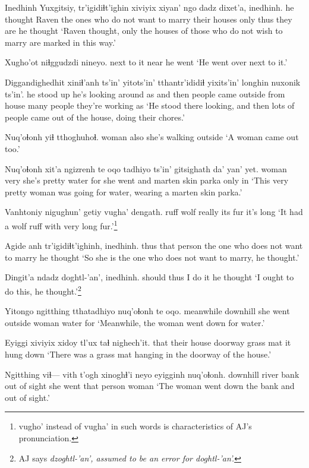 \documentclass[12pt]{article}
\begin{document}
\gll Inedhinh Yuxgitsiy, tr'igidiɬt'ighin   xiviyix xiyan' {ngo dadz} dixet'a, inedhinh.
{he thought} Raven  {the ones who do not want to marry} {their houses} only thus  {they are} {he thought}
\glt `Raven thought, only the houses of those who do not wish to marry are marked in this way.' 
\glend

\gll Xugho'ot niɬggudzdi nineyo.
{next to it} near  {he went}
\glt `He went over next to it.'
\glend

\gll Diggandighedhit xiniɬ'anh ts'in' yitots'in' tthantr'ididiɬ  yixits'in' longhin nuxonik ts'in'.
{he stood up} {he's looking around} as {and then} {people came outside} {from house} {many people} {they're working} as
\glt `He stood there looking, and then lots of people came out of the house, doing their chores.' 
\glend

\gll Nuq'oɬonh yiɬ tthoghuhoɬ.
woman also {she's walking outside}
\glt `A woman came out too.' 
\glend

\gll  Nuq'oɬonh xit'a ngizrenh te oqo tadhiyo ts'in' gitsighath da' yan' yet.
{} woman  very {she's pretty} water for {she went} and {marten skin} parka only in
\glt `This very pretty woman was going for water, wearing a marten skin parka.' 
\glend

\gll Vanhtoniy nigughun' getiy vugha' dengath.
ruff  wolf  really {its fur} {it's long}
\glt `It had a wolf ruff with very long fur.'\footnote{vugho' instead of vugha' in such words is characteristics of AJ's pronunciation.}
\glend

\gll Agide  anh tr'igidiɬt'ighinh,   inedhinh.
thus {that person} {the one who does not want to marry} {he thought}
\glt `So she is the one who does not want to marry, he thought.'
\glend

\gll Dingit'a ndadz doghtl-'an', inedhinh.
should  thus {I do it}  {he thought}
\glt `I ought to do this, he thought.'\footnote{AJ says \em dzoghtl-'an', \em assumed to be an error for \em doghtl-'an'.} 
\glend

\gll Yitongo ngitthing tthatadhiyo  nuq'oɬonh te oqo.
meanwhile downhill {she went outside} woman water for
\glt `Meanwhile, the woman went down for water.'
\glend

\gll Eyiggi xiviyix  xidoy  tl'ux taɬ nighech'it.
that {their house} doorway grass mat {it hung down}
\glt `There was a grass mat hanging in the doorway of the house.'
\glend

\gll Ngitthing viɬ--- {vith t'ogh} xinoghɬ'i neyo  eyigginh nuq'oɬonh.
downhill {} {river bank} {out of sight} {she went} {that person} woman
\glt `The woman went down the bank and out of sight.'
\glend
\end{document}
